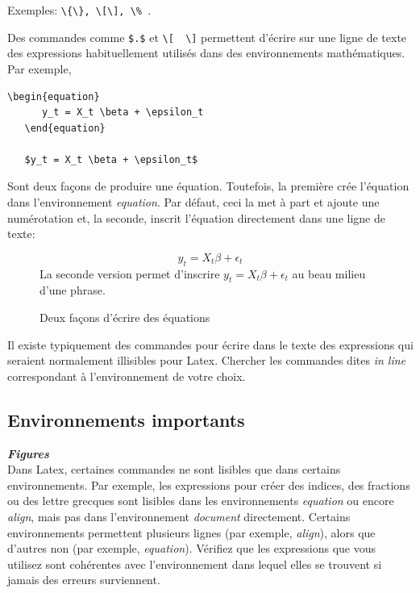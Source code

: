 \documentclass[12pt]{article}
\begin{document}
   Exemples: \lstinline|\{\}, \[\], \% |.
   
   Des commandes comme \lstinline|$.$| et \lstinline|\[  \]| permettent d'écrire sur une ligne de texte des expressions habituellement utilisés dans des environnements mathématiques. Par exemple,
   
   \begin{lstlisting}[frame=single]
   \begin{equation}
      y_t = X_t \beta + \epsilon_t
   \end{equation}
   
   $y_t = X_t \beta + \epsilon_t$
   \end{lstlisting}
   
   Sont deux façons de produire une équation. Toutefois, la première crée l'équation dans l'environnement \textit{equation}. Par défaut, ceci la met à part et ajoute une numérotation et, la seconde, inscrit l'équation directement dans une ligne de texte:
   
   \begin{figure}[H]
   	   \begin{equation}
   	   y_t = X_t \beta + \epsilon_t
   	   \end{equation}
   	   La seconde version permet d'inscrire $y_t = X_t \beta + \epsilon_t$ au beau milieu d'une phrase.
   	   \caption{Deux façons d'écrire des équations}
   \end{figure}
   
   Il existe typiquement des commandes pour écrire dans le texte des expressions qui seraient normalement illisibles pour Latex. Chercher les commandes dites \textit{in line} correspondant à l'environnement de votre choix.
   
   \subsection{Environnements importants}
   
   \textbf{\textit{Figures}} \\
   Dans Latex, certaines commandes ne sont lisibles que dans certains environnements. Par exemple, les expressions pour créer des indices, des fractions ou des lettre grecques sont lisibles dans les environnements \textit{equation} ou encore \textit{align}, mais pas dans l'environnement \textit{document} directement. Certains environnements permettent plusieurs lignes (par exemple, \textit{align}), alors que d'autres non (par exemple, \textit{equation}). Vérifiez que les expressions que vous utilisez sont cohérentes avec l'environnement dans lequel elles se trouvent si jamais des erreurs surviennent. \\
   
\end{document}
